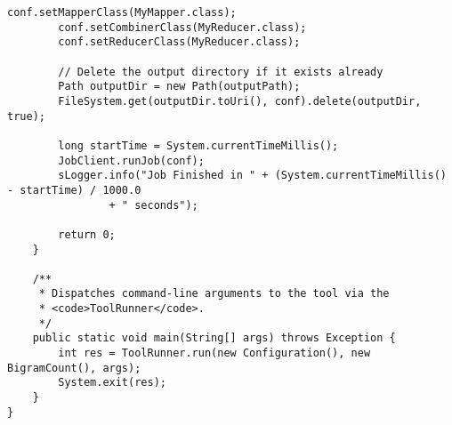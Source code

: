\documentclass{article} %
\begin{document}
\begin{lstlisting}[style=Java]
		conf.setMapperClass(MyMapper.class);
		conf.setCombinerClass(MyReducer.class);
		conf.setReducerClass(MyReducer.class);

		// Delete the output directory if it exists already
		Path outputDir = new Path(outputPath);
		FileSystem.get(outputDir.toUri(), conf).delete(outputDir, true);

		long startTime = System.currentTimeMillis();
		JobClient.runJob(conf);
		sLogger.info("Job Finished in " + (System.currentTimeMillis() - startTime) / 1000.0
				+ " seconds");

		return 0;
	}

	/**
	 * Dispatches command-line arguments to the tool via the
	 * <code>ToolRunner</code>.
	 */
	public static void main(String[] args) throws Exception {
		int res = ToolRunner.run(new Configuration(), new BigramCount(), args);
		System.exit(res);
	}
}
\end{lstlisting}
\end{document}
